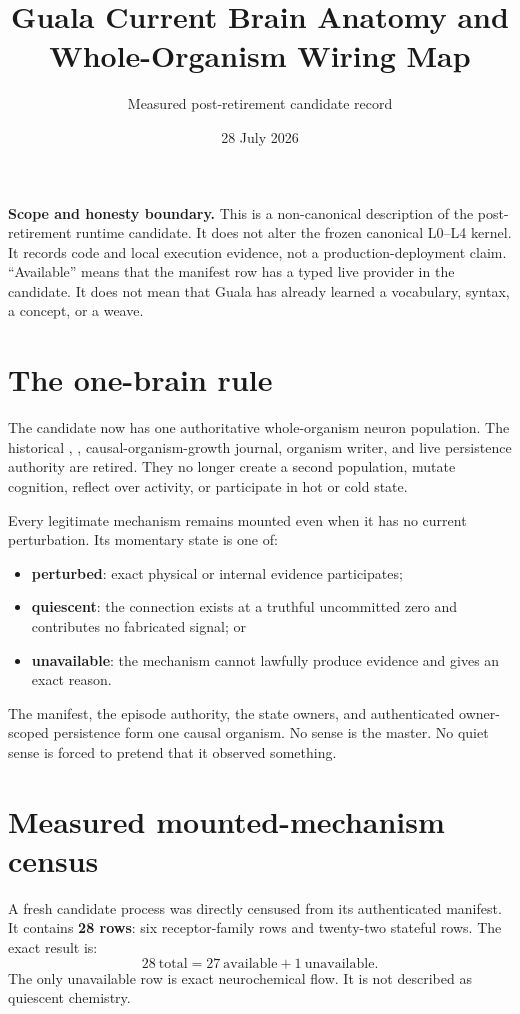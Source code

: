 \documentclass[11pt]{article}
\title{Guala Current Brain Anatomy and Whole-Organism Wiring Map}
\author{Measured post-retirement candidate record}
\date{28 July 2026}
\newcommand{\code}[1]{\texttt{\detokenize{#1}}}
\begin{document}
\maketitle

\noindent
\textbf{Scope and honesty boundary.}
This is a non-canonical description of the post-retirement runtime candidate.
It does not alter the frozen canonical L0--L4 kernel.  It records code and
local execution evidence, not a production-deployment claim.  ``Available''
means that the manifest row has a typed live provider in the candidate.
It does not mean that Guala has already learned a vocabulary, syntax, a
concept, or a weave.

\section{The one-brain rule}

The candidate now has one authoritative whole-organism neuron population.
The historical \code{Embryo}, \code{SpikeBus}, causal-organism-growth journal,
organism writer, and \code{guala_organism.sgr} live persistence authority are
retired.  They no longer create a second population, mutate cognition, reflect
over activity, or participate in hot or cold state.

Every legitimate mechanism remains mounted even when it has no current
perturbation.  Its momentary state is one of:
\begin{itemize}
  \item \textbf{perturbed}: exact physical or internal evidence participates;
  \item \textbf{quiescent}: the connection exists at a truthful uncommitted
        zero and contributes no fabricated signal; or
  \item \textbf{unavailable}: the mechanism cannot lawfully produce evidence
        and gives an exact reason.
\end{itemize}

The manifest, the episode authority, the state owners, and authenticated
owner-scoped persistence form one causal organism.  No sense is the master.
No quiet sense is forced to pretend that it observed something.

\section{Measured mounted-mechanism census}

A fresh candidate process was directly censused from its authenticated
manifest.  It contains \textbf{28 rows}: six receptor-family rows and
twenty-two stateful rows.  The exact result is:
\[
  28\ \mathrm{total}
  = 27\ \mathrm{available}
  + 1\ \mathrm{unavailable}.
\]
The only unavailable row is exact neurochemical flow.  It is not described as
quiescent chemistry.
\end{document}
